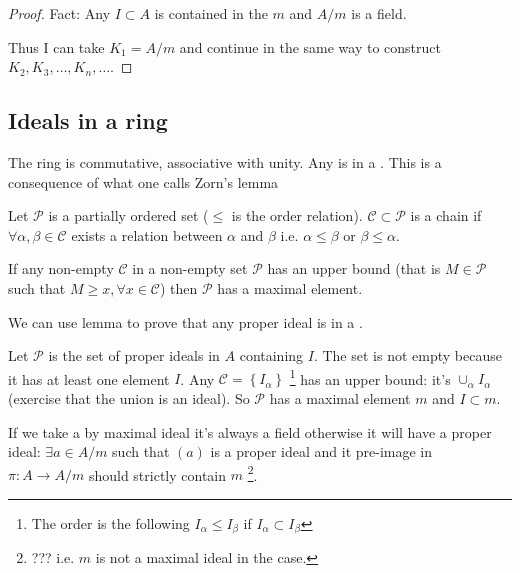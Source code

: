 \begin{theorem}
\begin{proof}
    Fact: Any  $I \subset A$ is contained in
    the  $m$ and $A/m$ is a field.

    Thus I can take $K_1 = A/m$ and continue in the same way to
    construct $K_2, K_3, \dots, K_n, \dots$.
  \end{proof}
  \label{thm:lec2_2}
\end{theorem}

\subsection{Ideals in a ring}
The ring is commutative, associative with unity. Any
 is in a . This is a
consequence of what one calls Zorn's lemma

\begin{definition}[Chain]
  Let $\mathcal{P}$ is a partially ordered set ($\le$ is the order
  relation). $\mathcal{C} \subset \mathcal{P}$ is a chain if
  $\forall \alpha, \beta \in \mathcal{C}$ exists a relation between
  $\alpha$ and $\beta$ i.e. $\alpha \le \beta$ or $\beta \le \alpha$.
  \label{def:chain}
\end{definition}

\begin{lemma}[Zorn]
  If any non-empty  $\mathcal{C}$ in a non-empty set
  $\mathcal{P}$ has an upper bound (that is $M \in \mathcal{P}$ such
  that $M \ge x, \forall x \in \mathcal{C}$) then $\mathcal{P}$ has a
  maximal element.
  \label{lem:zorn}
\end{lemma}

We can use  lemma to prove that any proper ideal is
in a .

Let $\mathcal{P}$ is the set of proper ideals in $A$ containing
$I$. The set is not empty because it has at least one element $I$. Any
 $\mathcal{C} = \left\{I_\alpha\right\}$
\footnote{
  The order is the following $I_\alpha \le I_\beta$ if
  $I_\alpha \subset I_\beta$
}
has an upper bound: it's $\cup_\alpha I_\alpha$ (exercise that the
union is an ideal). So $\mathcal{P}$ has a maximal element $m$ and $I
\subset m$.

If we take a  by maximal ideal it's always a
field otherwise 
it will have a proper ideal: $\exists a \in A/m$ such that $(a)$ is a
proper ideal and it pre-image in $\pi: A \to A/m$ should strictly
contain $m$
\footnote{ ??? i.e. $m$ is not a maximal ideal in the case.
}.

